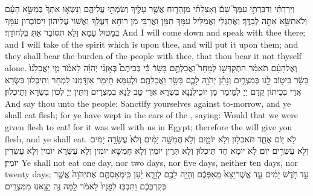 {וְיָרַדְתִּ֗י וְדִבַּרְתִּ֣י עִמְּךָ֮ שָׁם֒ וְאָצַלְתִּ֗י מִן\maqqaf הָר֛וּחַ אֲשֶׁ֥ר עָלֶ֖יךָ וְשַׂמְתִּ֣י עֲלֵיהֶ֑ם וְנָשְׂא֤וּ אִתְּךָ֙ בְּמַשָּׂ֣א הָעָ֔ם וְלֹא\maqqaf תִשָּׂ֥א אַתָּ֖ה לְבַדֶּֽךָ׃}
{וְאֶתְגְּלֵי וַאֲמַלֵּיל עִמָּךְ תַּמָּן וַאֲרַבֵּי מִן רוּחָא דַּעֲלָךְ וַאֲשַׁוֵּי עֲלֵיהוֹן וִיסוֹבְרוּן עִמָּךְ בְּמַטוּל עַמָּא וְלָא תְסוֹבַר אַתְּ בִּלְחוֹדָךְ׃}
{And I will come down and speak with thee there; and I will take of the spirit which is upon thee, and will put it upon them; and they shall bear the burden of the people with thee, that thou bear it not thyself alone.}{}
{וְאֶל\maqqaf הָעָ֨ם תֹּאמַ֜ר הִתְקַדְּשׁ֣וּ לְמָחָר֮ וַאֲכַלְתֶּ֣ם בָּשָׂר֒ כִּ֡י בְּכִיתֶם֩ בְּאׇזְנֵ֨י יְהֹוָ֜ה לֵאמֹ֗ר מִ֤י יַאֲכִלֵ֙נוּ֙ בָּשָׂ֔ר כִּי\maqqaf ט֥וֹב לָ֖נוּ בְּמִצְרָ֑יִם וְנָתַ֨ן יְהֹוָ֥ה לָכֶ֛ם בָּשָׂ֖ר וַאֲכַלְתֶּֽם׃}
{וּלְעַמָּא תֵימַר אִזְדָּמַנוּ לִמְחַר וְתֵיכְלוּן בִּשְׂרָא אֲרֵי בְּכֵיתוֹן קֳדָם יְיָ לְמֵימַר מַן יוֹכֵילִנַּנָא בִּשְׂרָא אֲרֵי טָב לַנָא בְּמִצְרָיִם וְיִתֵּין יְיָ לְכוֹן בִּשְׂרָא וְתֵיכְלוּן׃}
{And say thou unto the people: Sanctify yourselves against to-morrow, and ye shall eat flesh; for ye have wept in the ears of the \lord, saying: Would that we were given flesh to eat! for it was well with us in Egypt; therefore the \lord\space will give you flesh, and ye shall eat.}{}
{לֹ֣א י֥וֹם אֶחָ֛ד תֹּאכְל֖וּן וְלֹ֣א יוֹמָ֑יִם וְלֹ֣א \legarmeh  חֲמִשָּׁ֣ה יָמִ֗ים וְלֹא֙ עֲשָׂרָ֣ה יָמִ֔ים וְלֹ֖א עֶשְׂרִ֥ים יֽוֹם׃}
{לָא יוֹמָא חַד תֵּיכְלוּן וְלָא תְּרֵין יוֹמִין וְלָא חַמְשָׁא יוֹמִין וְלָא עֶשְׂרָא יוֹמִין וְלָא עֶשְׂרִין יוֹמִין׃}
{Ye shall not eat one day, nor two days, nor five days, neither ten days, nor twenty days;}{}
{עַ֣ד \legarmeh  חֹ֣דֶשׁ יָמִ֗ים עַ֤ד אֲשֶׁר\maqqaf יֵצֵא֙ מֵֽאַפְּכֶ֔ם וְהָיָ֥ה לָכֶ֖ם לְזָרָ֑א יַ֗עַן כִּֽי\maqqaf מְאַסְתֶּ֤ם אֶת\maqqaf יְהֹוָה֙ אֲשֶׁ֣ר בְּקִרְבְּכֶ֔ם וַתִּבְכּ֤וּ לְפָנָיו֙ לֵאמֹ֔ר לָ֥מָּה זֶּ֖ה יָצָ֥אנוּ מִמִּצְרָֽיִם׃}
